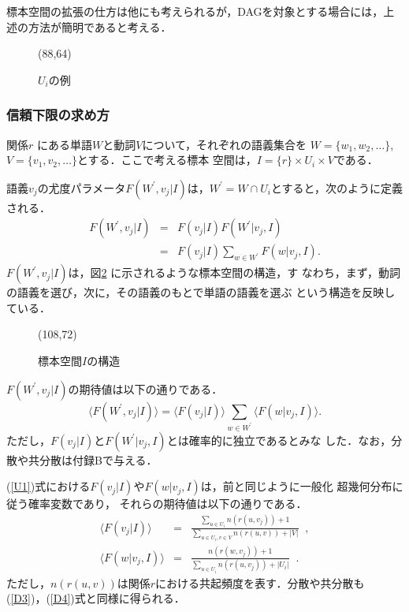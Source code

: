 標本空間の拡張の仕方は他にも考えられるが，DAGを対象とする場合には，上
述の方法が簡明であると考える．

\begin{figure}[htbp]
  \begin{center}
    \leavevmode
    \atari(88,64)
  \end{center}
  \caption{$U_i$の例}
  \label{fig:U_i}
\end{figure}

\subsubsection{信頼下限の求め方}

関係$r$ にある単語$W$と動詞$V$について，それぞれの語義集合を
$W=\{w_1,w_2,\ldots\}$, $V=\{v_1,v_2,\ldots\}$とする．ここで考える標本
空間は，$I = \{r\} \times U_i \times V$である．

語義$v_j$の尤度パラメータ$F(W^\prime,v_j|I)$は，$W^\prime = W \cap
U_i$とすると，次のように定義される．
\begin{eqnarray}
  \label{U1}
  F(W^\prime,v_j|I) &= &F(v_j | I) F(W^\prime|v_j,I) \nonumber \\
  & = & F(v_j | I) \sum_{w \in W^\prime} F(w | v_j,I).
\end{eqnarray}
$F(W^\prime,v_j|I)$は，図\ref{fig:I} に示されるような標本空間の構造，す
なわち，まず，動詞の語義を選び，次に，その語義のもとで単語の語義を選ぶ
という構造を反映している．

\begin{figure}[htbp]
  \begin{center}
    \leavevmode
    \atari(108,72)
  \end{center}
  \caption{標本空間$I$の構造}
  \label{fig:I}
\end{figure}

$F(W^\prime,v_j|I)$の期待値は以下の通りである．
\begin{equation}
  \label{U3}
  \langle F(W^\prime,v_j|I) \rangle = \langle F(v_j | I) \rangle \sum_{w \in W^\prime} \langle F(w | v_j,I) \rangle.
\end{equation}
ただし，$F(v_j|I)$と$F(W^\prime | v_j,I)$とは確率的に独立であるとみな
した．なお，分散や共分散は付録Bで与える．

(\ref{U1})式における$F(v_j|I)$や$F(w | v_j,I)$は，前と同じように一般化
超幾何分布に従う確率変数であり， それらの期待値は以下の通りである．
\begin{eqnarray}
  \label{U2a}
  \langle F(v_j | I) \rangle & = & \frac{\sum_{u \in U_i} n(r(u,v_j)) + 1}{\sum_{u \in U_i,v \in V} n(r(u,v)) + |V|}\;\;, \\
  \label{U2b}
  \langle F(w | v_j,I) \rangle & = & \frac{n(r(w,v_j)) + 1}{\sum_{u \in U_i} n(r(u,v_j)) + |U_i|}\;\;.
\end{eqnarray}
ただし，$n(r(u,v))$は関係$r$における共起頻度を表す．分散や共分散も
(\ref{D3})，(\ref{D4})式と同様に得られる．

